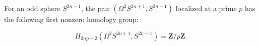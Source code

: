For an odd sphere $S^{2n-1}$, the pair $(\Omega^2 S^{2n+1}, S^{2n-1})$ localized at a prime $p$ has the following first nonzero homology group:

$$H_{2np-2}(\Omega^2 S^{2n+1}, S^{2n-1}) = \mathbf{Z}/p\mathbf{Z}.$$
